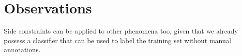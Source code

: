 \documentclass[12pt]{article}
\begin{document}
\section{Observations}
  Side constraints can be applied to other phenomena too, given that we already possess a classifier that can be used to label the training set without manual annotations.



\end{document}
